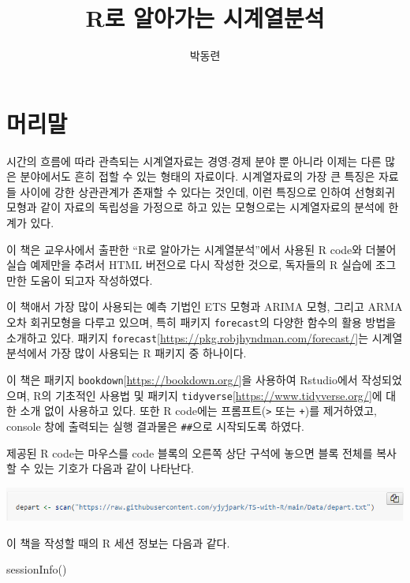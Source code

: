 \documentclass[
]{book}
\title{R로 알아가는 시계열분석}
\author{박동련}
\date{}
\newenvironment{Shaded}{\begin{snugshade}}{\end{snugshade}}
\newcommand{\FunctionTok}[1]{\textcolor[rgb]{0.00,0.00,0.00}{#1}}
\newcommand{\NormalTok}[1]{#1}
\begin{document}
\maketitle

{
\setcounter{tocdepth}{1}
\tableofcontents
}
\hypertarget{uxba38uxb9acuxb9d0}{%
\chapter*{머리말}\label{uxba38uxb9acuxb9d0}}

시간의 흐름에 따라 관측되는 시계열자료는 경영\(\cdot\)경제 분야 뿐 아니라 이제는 다른 많은 분야에서도 흔히 접할 수 있는 형태의 자료이다. 시계열자료의 가장 큰 특징은 자료들 사이에 강한 상관관계가 존재할 수 있다는 것인데, 이런 특징으로 인하여 선형회귀모형과 같이 자료의 독립성을 가정으로 하고 있는 모형으로는 시계열자료의 분석에 한계가 있다.

이 책은 교우사에서 출판한 ``R로 알아가는 시계열분석''에서 사용된 R code와 더불어 실습 예제만을 추려서 HTML 버전으로 다시 작성한 것으로, 독자들의 R 실습에 조그만한 도움이 되고자 작성하였다.

이 책애서 가장 많이 사용되는 예측 기법인 ETS 모형과 ARIMA 모형, 그리고 ARMA 오차 회귀모형을 다루고 있으며, 특히 패키지 \texttt{forecast}의 다양한 함수의 활용 방법을 소개하고 있다. 패키지 \texttt{forecast}{[}\url{https://pkg.robjhyndman.com/forecast/}{]}는 시계열분석에서 가장 많이 사용되는 R 패키지 중 하나이다.

이 책은 패키지 \texttt{bookdown}{[}\url{https://bookdown.org/}{]}을 사용하여 Rstudio에서 작성되었으며, R의 기초적인 사용법 및 패키지 \texttt{tidyverse}{[}\url{https://www.tidyverse.org/}{]}에 대한 소개 없이 사용하고 있다. 또한 R code에는 프롬프트(\texttt{\textgreater{}} 또는 \texttt{+})를 제거하였고, console 창에 출력되는 실행 결과물은 \texttt{\#\#}으로 시작되도록 하였다.

제공된 R code는 마우스를 code 블록의 오른쪽 상단 구석에 놓으면 블록 전체를 복사할 수 있는 기호가 다음과 같이 나타난다.

\includegraphics{Figures/code-block.png}

이 책을 작성할 때의 R 세션 정보는 다음과 같다.

\begin{Shaded}
\begin{Highlighting}[]
\FunctionTok{sessionInfo}\NormalTok{()}
\end{Highlighting}
\end{Shaded}
\end{document}
